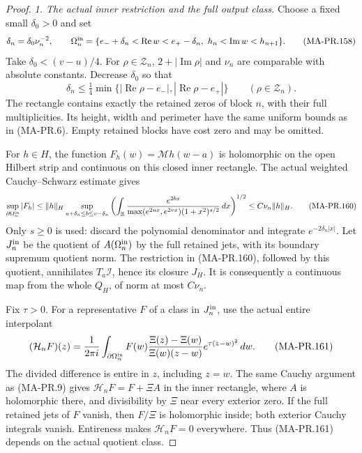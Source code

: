 \begin{proof}
\emph{1. The actual inner restriction and the full output class.}
Choose a fixed small \(\delta_0>0\) and set
\[
 \delta_n=\delta_0\nu_n^{-2},\qquad
 \Omega_n^{\rm in}
  =\{e_-+\delta_n<\operatorname{Re}w<e_+-\delta_n,\
                       h_n<\operatorname{Im}w<h_{n+1}\}.
 \tag{MA-PR.158}
\]
Take \(\delta_0<(v-u)/4\).  For \(\rho\in\mathcal Z_n\),
\(2+|\operatorname{Im}\rho|\) and \(\nu_n\) are comparable
with absolute constants.  Decrease \(\delta_0\) so that
\[
 \delta_n\le\tfrac14
           \min\{|\operatorname{Re}\rho-e_-|,
                          |\operatorname{Re}\rho-e_+|\}
                      \qquad(\rho\in\mathcal Z_n).
 \tag{MA-PR.159}
\]
The rectangle contains exactly the retained zeros of
block \(n\), with their full multiplicities.  Its height,
width and perimeter have the same uniform bounds as
in (MA-PR.6).  Empty retained blocks have cost zero
and may be omitted.

For \(h\in H\), the function
\(F_h(w)=\mathcal Mh(w-a)\) is holomorphic on the
open Hilbert strip and continuous on this closed
inner rectangle.  The actual weighted
Cauchy--Schwarz estimate gives
\[
 \sup_{\partial\Omega_n^{\rm in}}|F_h|
 \le
 \|h\|_H
 \sup_{u+\delta_n\le b\le v-\delta_n}
 \left(\int_{\mathbb R}
      \frac{e^{2bx}}{\max(e^{2ux},e^{2vx})(1+x^2)^{s/2}}
                  \,dx\right)^{1/2}
 \le C\nu_n\|h\|_H .
 \tag{MA-PR.160}
\]
Only \(s\ge0\) is used: discard the polynomial denominator
and integrate \(e^{-2\delta_n|x|}\).
Let \(J_n^{\rm in}\) be the quotient of
\(A(\Omega_n^{\rm in})\) by the full retained jets,
with its boundary supremum quotient norm.  The
restriction in (MA-PR.160), followed by this quotient,
annihilates \(T_a\mathcal I\), hence its closure \(J_H\).
It is consequently a continuous map from the whole
\(Q_H\), of norm at most \(C\nu_n\).

Fix \(\tau>0\).  For a representative \(F\) of a class
in \(J_n^{\rm in}\), use the actual entire interpolant
\[
 (\mathcal H_nF)(z)
   =\frac1{2\pi i}\int_{\partial\Omega_n^{\rm in}}
       F(w)\frac{\Xi(z)-\Xi(w)}{\Xi(w)(z-w)}
                        e^{\tau(z-w)^2}\,dw .
 \tag{MA-PR.161}
\]
The divided difference is entire in \(z\), including
\(z=w\).  The same Cauchy argument as (MA-PR.9)
gives \(\mathcal H_nF=F+\Xi A\) in the inner
rectangle, where \(A\) is holomorphic there, and
divisibility by \(\Xi\) near every exterior zero.
If the full retained jets of \(F\) vanish, then
\(F/\Xi\) is holomorphic inside; both exterior
Cauchy integrals vanish.  Entireness makes
\(\mathcal H_nF=0\) everywhere.  Thus (MA-PR.161)
depends on the actual quotient class.


\end{proof}
